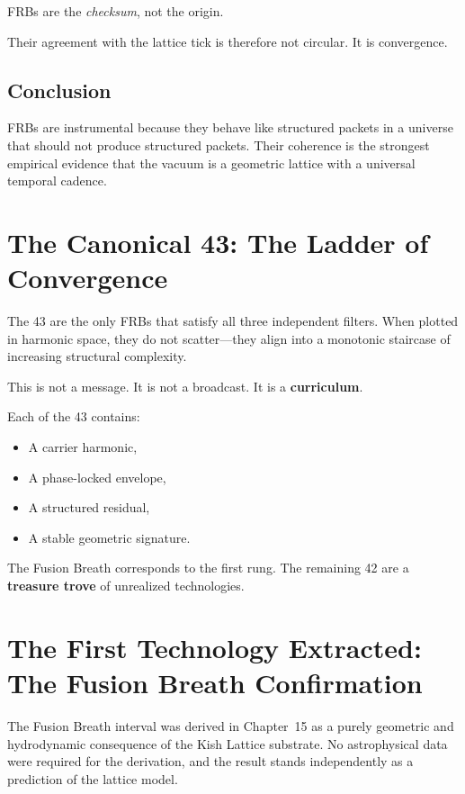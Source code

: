 \documentclass[11pt, letterpaper, openany]{book}
\begin{document}
FRBs are the \emph{checksum}, not the origin.

Their agreement with the lattice tick is therefore not circular.  
It is convergence.

\subsection*{Conclusion}
FRBs are instrumental because they behave like structured packets in a universe that should not 
produce structured packets.  
Their coherence is the strongest empirical evidence that the vacuum is a geometric lattice with a 
universal temporal cadence.


\section{The Canonical 43: The Ladder of Convergence}

The 43 are the only FRBs that satisfy all three independent filters. When plotted in harmonic
space, they do not scatter—they align into a monotonic staircase of increasing structural
complexity.

This is not a message.  
It is not a broadcast.  
It is a \textbf{curriculum}.

Each of the 43 contains:

\begin{itemize}
    \item A carrier harmonic,
    \item A phase-locked envelope,
    \item A structured residual,
    \item A stable geometric signature.
\end{itemize}

The Fusion Breath corresponds to the first rung.  
The remaining 42 are a \textbf{treasure trove} of unrealized technologies.


\section{The First Technology Extracted: The Fusion Breath Confirmation}
\label{sec:fusion_breath_confirmation}

The Fusion Breath interval was derived in Chapter~15 as a purely geometric and
hydrodynamic consequence of the Kish Lattice substrate. No astrophysical data were
required for the derivation, and the result stands independently as a prediction of the
lattice model.
\end{document}

